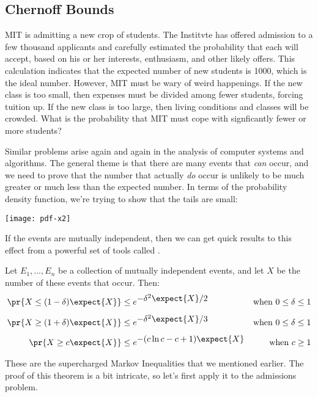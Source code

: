 \begin{editingnotes}
\section{Chernoff Bounds}

MIT is admitting a new crop of students.  The Institvte has offered
admission to a few thousand applicants and carefully estimated the
probability that each will accept, based on his or her interests,
enthusiasm, and other likely offers.  This calculation indicates that
the expected number of new students is 1000, which is the ideal
number.  However, MIT must be wary of weird happenings.  If the new
class is too small, then expenses must be divided among fewer
students, forcing tuition up.  If the new class is too large, then
living conditions and classes will be crowded.  What is the
probability that MIT must cope with signficantly fewer or more
students?

Similar problems arise again and again in the analysis of computer
systems and algorithms.  The general theme is that there are many
events that \textit{can} occur, and we need to prove that the number
that actually \textit{do} occur is unlikely to be much greater or much
less than the expected number.  In terms of the probability density
function, we're trying to show that the tails are small:
%
\begin{center}
\texttt{[image: pdf-x2]}
\end{center}
%
If the events are mutually independent, then we can get quick results
to this effect from a powerful set of tools called .

\begin{theorem}
\label{th:chernoff}
Let $E_1, \ldots, E_n$ be a collection of mutually independent events,
and let $X$ be the number of these events that occur.  Then:
%
\begin{align*}
\pr{X \leq (1 - \delta) \expect{X}} & \leq e^{\textstyle -\delta^2 \expect{X} / 2}
    & \text{when $0 \leq \delta \leq 1$} \\[1ex]
\pr{X \geq (1 + \delta) \expect{X}} & \leq e^{\textstyle -\delta^2 \expect{X} / 3}
    & \text{when $0 \leq \delta \leq 1$} \\[1ex]
\pr{X \geq c \expect{X}} & \leq e^{\textstyle -(c \ln c - c + 1) \expect{X}}
    & \text{when $c \geq 1$}
\end{align*}
\end{theorem}

\noindent These are the supercharged Markov Inequalities that we
mentioned earlier.  The proof of this theorem is a bit intricate, so
let's first apply it to the admissions problem.


\end{editingnotes}
